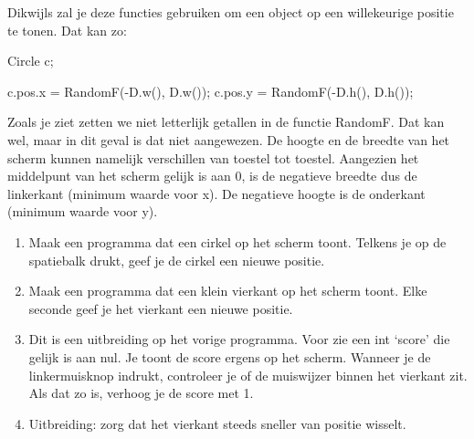 Dikwijls zal je deze functies gebruiken om een object op een willekeurige positie te tonen. Dat kan zo:

\begin{code}
Circle c;

c.pos.x = RandomF(-D.w(), D.w());
c.pos.y = RandomF(-D.h(), D.h());
\end{code}

Zoals je ziet zetten we niet letterlijk getallen in de functie RandomF. Dat kan wel, maar in dit geval is dat niet aangewezen. De hoogte en de breedte van het scherm kunnen namelijk verschillen van toestel tot toestel. Aangezien het middelpunt van het scherm gelijk is aan 0, is de negatieve breedte dus de linkerkant (minimum waarde voor x). De negatieve hoogte is de onderkant (minimum waarde voor y).

\begin{exercise}
\begin{enumerate}
\item Maak een programma dat een cirkel op het scherm toont. Telkens je op de spatiebalk drukt, geef je de cirkel een nieuwe positie.
\item Maak een programma dat een klein vierkant op het scherm toont. Elke seconde geef je het vierkant een nieuwe positie.
\item Dit is een uitbreiding op het vorige programma. Voor zie een int `score' die gelijk is aan nul. Je toont de score ergens op het scherm. Wanneer je de linkermuisknop indrukt, controleer je of de muiswijzer binnen het vierkant zit. Als dat zo is, verhoog je de score met 1.
\item Uitbreiding: zorg dat het vierkant steeds sneller van positie wisselt.
\end{enumerate}  
\end{exercise}



